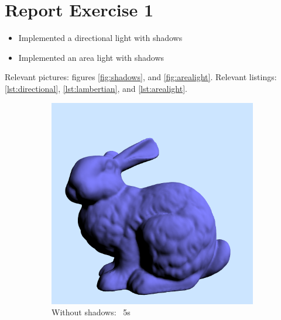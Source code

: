  \section{Report Exercise 1}

\begin{itemize}
\item{Implemented a directional light with shadows}
\item{Implemented an area light with shadows}
\end{itemize}

Relevant pictures: figures \ref{fig:shadows}, and \ref{fig:arealight}.
Relevant listings: \ref{lst:directional}, \ref{lst:lambertian}, and \ref{lst:arealight}.

\begin{figure}
	\centering
	\begin{subfigure}[b]{0.4\textwidth}
		\includegraphics[width=\textwidth]{week1/bunny_noshadows.png}
		\caption{Without shadows: ~5s}
		\label{fig:bunnynoshadows}
	\end{subfigure}
	\begin{subfigure}[b]{0.4\textwidth}

\end{subfigure}
\end{figure}
